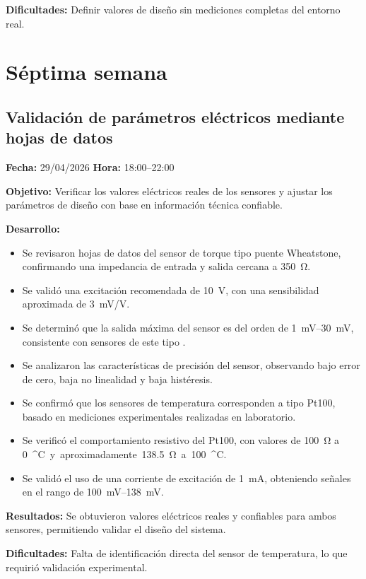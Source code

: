 \documentclass[12pt]{article}
\begin{document}
\textbf{Dificultades:}
Definir valores de diseño sin mediciones completas del entorno real.

\section{Séptima semana}

\subsection{Validación de parámetros eléctricos mediante hojas de datos}
\textbf{Fecha:} 29/04/2026 \quad \textbf{Hora:} 18:00--22:00

\textbf{Objetivo:}
Verificar los valores eléctricos reales de los sensores y ajustar los parámetros de diseño con base en información técnica confiable.

\textbf{Desarrollo:}
\begin{itemize}
\item Se revisaron hojas de datos del sensor de torque tipo puente Wheatstone, confirmando una impedancia de entrada y salida cercana a \SI{350}{\ohm}.
\item Se validó una excitación recomendada de \SI{10}{V}, con una sensibilidad aproximada de \SI{3}{mV/V}.
\item Se determinó que la salida máxima del sensor es del orden de \SIrange{1}{30}{mV}, consistente con sensores de este tipo \cite{InterfaceSM50}.
\item Se analizaron las características de precisión del sensor, observando bajo error de cero, baja no linealidad y baja histéresis.
\item Se confirmó que los sensores de temperatura corresponden a tipo Pt100, basado en mediciones experimentales realizadas en laboratorio.
\item Se verificó el comportamiento resistivo del Pt100, con valores de \SI{100}{\ohm} a \SI{0}{^\circ C} y aproximadamente \SI{138.5}{\ohm} a \SI{100}{^\circ C}.
\item Se validó el uso de una corriente de excitación de \SI{1}{mA}, obteniendo señales en el rango de \SIrange{100}{138}{mV}.
\end{itemize}

\textbf{Resultados:}
Se obtuvieron valores eléctricos reales y confiables para ambos sensores, permitiendo validar el diseño del sistema.

\textbf{Dificultades:}
Falta de identificación directa del sensor de temperatura, lo que requirió validación experimental.
\end{document}
